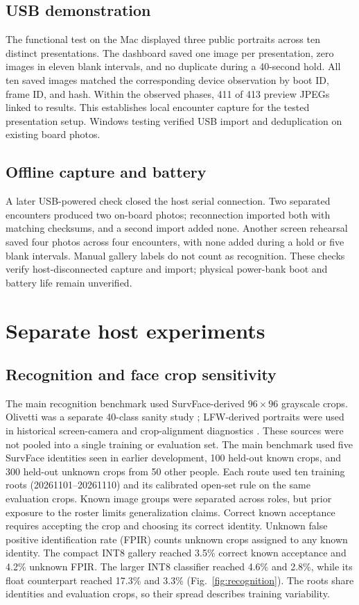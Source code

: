\documentclass[10pt,letterpaper,twocolumn]{article}
\begin{document}
\subsection{USB demonstration}
The functional test on the Mac displayed three public portraits across ten distinct presentations. The dashboard saved one image per presentation, zero images in eleven blank intervals, and no duplicate during a 40-second hold. All ten saved images matched the corresponding device observation by boot ID, frame ID, and hash. Within the observed phases, 411 of 413 preview JPEGs linked to results. This establishes local encounter capture for the tested presentation setup. Windows testing verified USB import and deduplication on existing board photos.

\subsection{Offline capture and battery}
A later USB-powered check closed the host serial connection. Two separated encounters produced two on-board photos; reconnection imported both with matching checksums, and a second import added none. Another screen rehearsal saved four photos across four encounters, with none added during a hold or five blank intervals. Manual gallery labels do not count as recognition. These checks verify host-disconnected capture and import; physical power-bank boot and battery life remain unverified.

\section{Separate host experiments}
\subsection{Recognition and face crop sensitivity}
The main recognition benchmark used SurvFace-derived \(96\times96\) grayscale crops. Olivetti was a separate 40-class sanity study \cite{olivetti}; LFW-derived portraits were used in historical screen-camera and crop-alignment diagnostics \cite{lfw}. These sources were not pooled into a single training or evaluation set. The main benchmark used five SurvFace identities seen in earlier development, 100 held-out known crops, and 300 held-out unknown crops from 50 other people. Each route used ten training roots (20261101--20261110) and its calibrated open-set rule on the same evaluation crops. Known image groups were separated across roles, but prior exposure to the roster limits generalization claims. Correct known acceptance requires accepting the crop and choosing its correct identity. Unknown false positive identification rate (FPIR) counts unknown crops assigned to any known identity. The compact INT8 gallery reached 3.5\% correct known acceptance and 4.2\% unknown FPIR. The larger INT8 classifier reached 4.6\% and 2.8\%, while its float counterpart reached 17.3\% and 3.3\% (Fig.~\ref{fig:recognition}). The roots share identities and evaluation crops, so their spread describes training variability.
\end{document}
